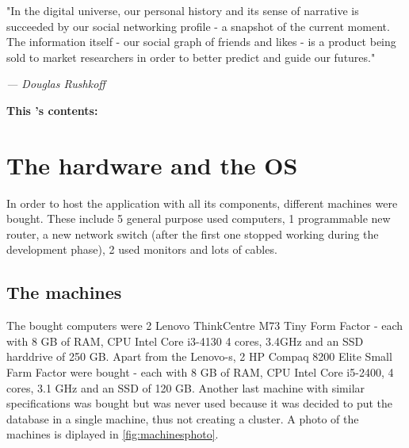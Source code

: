 \begin{figure}[H]%
	\label{fig:\chaptername\thechapter}%
\end{figure}%

\vspace*{-6.4cm}
\epigraph{"In the digital universe, our personal history and its sense of narrative is succeeded by our social networking profile - a snapshot of the current moment. The information itself - our social graph of friends and likes - is a product being sold to market researchers in order to better predict and guide our futures."}{\textit{--- Douglas Rushkoff}}

\noindent \large{\textbf{This {\MakeLowercase{\chaptername}}'s contents:}}
\vspace*{-0.75cm}
\minitoc \mtcskip \minilof
\vspace*{-0.5cm}
\section{The hardware and the OS} \label{section:ImplementingtheWebApp/ThehardwareandtheOS}
In order to host the application with all its components, different machines were bought.
These include 5 general purpose used computers, 1 programmable new router, a new network switch (after the first one stopped working during the development phase), 2 used monitors and lots of cables.

\subsection{The machines} \label{subsection:ImplementingtheWebApp/Thehardware/Themachines}
The bought computers were 2 Lenovo ThinkCentre M73 Tiny Form Factor - each with 8 GB of RAM, CPU Intel Core i3-4130 4 cores, 3.4GHz and an SSD harddrive of 250 GB.
Apart from the Lenovo-s, 2 HP Compaq 8200 Elite Small Farm Factor were bought - each with 8 GB of RAM, CPU Intel Core i5-2400, 4 cores, 3.1 GHz and an SSD of 120 GB.
Another last machine with similar specifications was bought but was never used because it was decided to put the database in a single machine, thus not creating a cluster.
A photo of the machines is diplayed in \hyperref[fig:machinesphoto]{\autoref{fig:machinesphoto}}.


